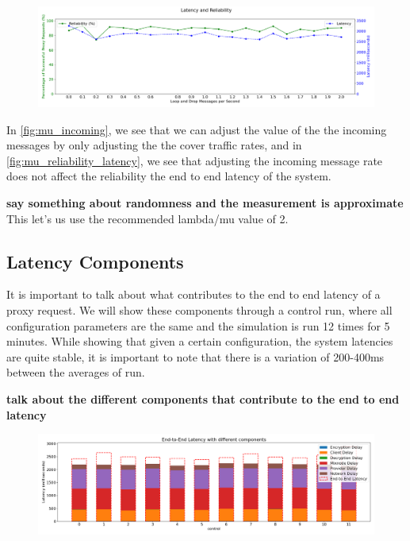 \documentclass[a4paper,11pt,oneside]{report}
\begin{document}
\begin{figure}[htbp]
    \centering
    \includegraphics[width=\textwidth]{plots/mu_reliability_latency.png}
    \caption{}
    \label{fig:mu_reliability_latency}
\end{figure}

In \autoref{fig:mu_incoming}, we see that we can adjust the value of the the incoming messages by only adjusting the the cover traffic rates, and in \autoref{fig:mu_reliability_latency}, we see that adjusting the incoming message rate does not affect the reliability the end to end latency of the system.

\textbf{say something about randomness and the measurement is approximate}
This let's us use the recommended lambda/mu value of 2.

\subsection{Latency Components}
It is important to talk about what contributes to the end to end latency of a proxy request. We will show these components through a control run, where all configuration parameters are the same and the simulation is run 12 times for 5 minutes. While showing that given a certain configuration, the system latencies are quite stable, it is important to note that there is a variation of 200-400ms between the averages of run. 

\textbf{talk about the different components that contribute to the end to end latency}

\begin{figure}[htbp]
    \centering
    \includegraphics[width=\textwidth]{plots/control_latency_components.png}
    \caption{}
    \label{fig:control_lambdas}
\end{figure}
\end{document}
